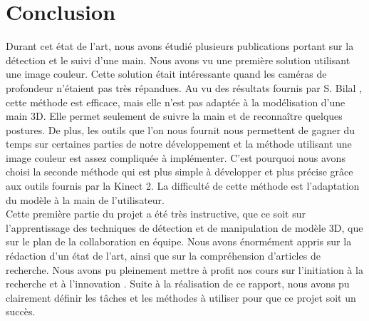 \chapter*{Conclusion}
Durant cet état de l'art, nous avons étudié plusieurs publications portant sur la détection et le suivi
d'une main. Nous avons vu une première solution utilisant une image couleur. Cette solution était
intéressante quand les caméras de profondeur n'étaient pas très répandues. Au vu des résultats fournis par S. Bilal
\cite{haarlike}, cette méthode est efficace, mais elle n'est pas adaptée à la modélisation d'une main 3D. Elle permet seulement
de suivre la main et de reconnaître quelques postures. De plus, les outils que l'on nous fournit nous permettent
de gagner du temps sur certaines parties de notre développement et la méthode utilisant une image couleur
est assez compliquée à implémenter. C'est pourquoi nous avons choisi la seconde méthode qui est plus
simple à développer et plus précise grâce aux outils fournis par la Kinect 2. La difficulté de cette méthode
est l'adaptation du modèle à la main de l'utilisateur.\\


Cette première partie du projet a été très instructive, que ce soit sur l'apprentissage des techniques de détection et de manipulation
de modèle 3D, que sur le plan de la collaboration en équipe. Nous avons énormément appris sur la rédaction d'un
état de l'art, ainsi que sur la compréhension d'articles de recherche. Nous avons pu pleinement mettre à profit
nos cours sur \og l'initiation à la recherche et à l'innovation \fg. Suite à la réalisation de ce rapport, nous avons pu
clairement définir les tâches et les méthodes à utiliser pour que ce projet soit un succès. 

